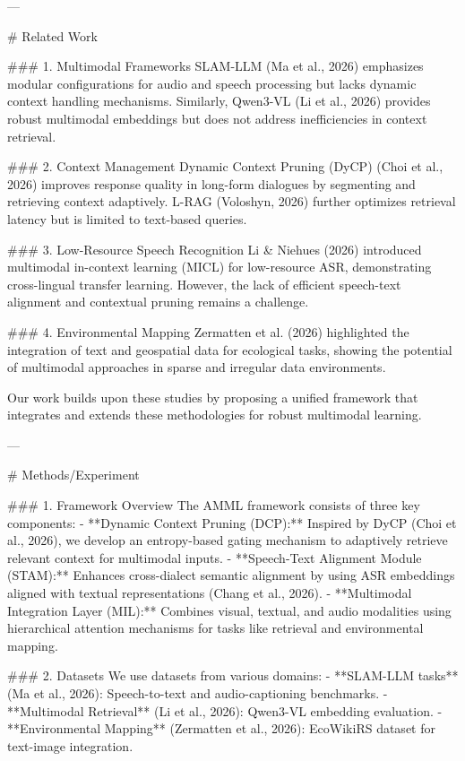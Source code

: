---

# Related Work

### 1. Multimodal Frameworks
SLAM-LLM (Ma et al., 2026) emphasizes modular configurations for audio and speech processing but lacks dynamic context handling mechanisms. Similarly, Qwen3-VL (Li et al., 2026) provides robust multimodal embeddings but does not address inefficiencies in context retrieval.

### 2. Context Management
Dynamic Context Pruning (DyCP) (Choi et al., 2026) improves response quality in long-form dialogues by segmenting and retrieving context adaptively. L-RAG (Voloshyn, 2026) further optimizes retrieval latency but is limited to text-based queries.

### 3. Low-Resource Speech Recognition
Li & Niehues (2026) introduced multimodal in-context learning (MICL) for low-resource ASR, demonstrating cross-lingual transfer learning. However, the lack of efficient speech-text alignment and contextual pruning remains a challenge.

### 4. Environmental Mapping
Zermatten et al. (2026) highlighted the integration of text and geospatial data for ecological tasks, showing the potential of multimodal approaches in sparse and irregular data environments.

Our work builds upon these studies by proposing a unified framework that integrates and extends these methodologies for robust multimodal learning.

---

# Methods/Experiment

### 1. Framework Overview
The AMML framework consists of three key components:
- **Dynamic Context Pruning (DCP):** Inspired by DyCP (Choi et al., 2026), we develop an entropy-based gating mechanism to adaptively retrieve relevant context for multimodal inputs.
- **Speech-Text Alignment Module (STAM):** Enhances cross-dialect semantic alignment by using ASR embeddings aligned with textual representations (Chang et al., 2026).
- **Multimodal Integration Layer (MIL):** Combines visual, textual, and audio modalities using hierarchical attention mechanisms for tasks like retrieval and environmental mapping.

### 2. Datasets
We use datasets from various domains:
- **SLAM-LLM tasks** (Ma et al., 2026): Speech-to-text and audio-captioning benchmarks.
- **Multimodal Retrieval** (Li et al., 2026): Qwen3-VL embedding evaluation.
- **Environmental Mapping** (Zermatten et al., 2026): EcoWikiRS dataset for text-image integration.

